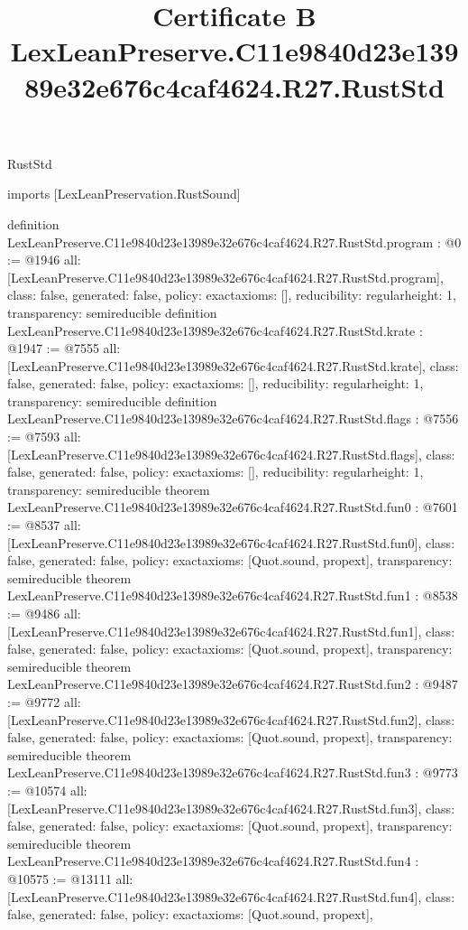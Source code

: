 \begin{lexlean}{RustStd}
\title{Certificate B LexLeanPreserve.C11e9840d23e13989e32e676c4caf4624.R27.RustStd}
\begin{coremodule}
imports [LexLeanPreservation.RustSound]

definition LexLeanPreserve.C11e9840d23e13989e32e676c4caf4624.R27.RustStd.program : @0 := @1946 {
  all: [LexLeanPreserve.C11e9840d23e13989e32e676c4caf4624.R27.RustStd.program],
  class: false,
  generated: false,
  policy: exact{axioms: []},
  reducibility: regular{height: 1},
  transparency: semireducible
}
definition LexLeanPreserve.C11e9840d23e13989e32e676c4caf4624.R27.RustStd.krate : @1947 := @7555 {
  all: [LexLeanPreserve.C11e9840d23e13989e32e676c4caf4624.R27.RustStd.krate],
  class: false,
  generated: false,
  policy: exact{axioms: []},
  reducibility: regular{height: 1},
  transparency: semireducible
}
definition LexLeanPreserve.C11e9840d23e13989e32e676c4caf4624.R27.RustStd.flags : @7556 := @7593 {
  all: [LexLeanPreserve.C11e9840d23e13989e32e676c4caf4624.R27.RustStd.flags],
  class: false,
  generated: false,
  policy: exact{axioms: []},
  reducibility: regular{height: 1},
  transparency: semireducible
}
theorem LexLeanPreserve.C11e9840d23e13989e32e676c4caf4624.R27.RustStd.fun0 : @7601 := @8537 {
  all: [LexLeanPreserve.C11e9840d23e13989e32e676c4caf4624.R27.RustStd.fun0],
  class: false,
  generated: false,
  policy: exact{axioms: [Quot.sound, propext]},
  transparency: semireducible
}
theorem LexLeanPreserve.C11e9840d23e13989e32e676c4caf4624.R27.RustStd.fun1 : @8538 := @9486 {
  all: [LexLeanPreserve.C11e9840d23e13989e32e676c4caf4624.R27.RustStd.fun1],
  class: false,
  generated: false,
  policy: exact{axioms: [Quot.sound, propext]},
  transparency: semireducible
}
theorem LexLeanPreserve.C11e9840d23e13989e32e676c4caf4624.R27.RustStd.fun2 : @9487 := @9772 {
  all: [LexLeanPreserve.C11e9840d23e13989e32e676c4caf4624.R27.RustStd.fun2],
  class: false,
  generated: false,
  policy: exact{axioms: [Quot.sound, propext]},
  transparency: semireducible
}
theorem LexLeanPreserve.C11e9840d23e13989e32e676c4caf4624.R27.RustStd.fun3 : @9773 := @10574 {
  all: [LexLeanPreserve.C11e9840d23e13989e32e676c4caf4624.R27.RustStd.fun3],
  class: false,
  generated: false,
  policy: exact{axioms: [Quot.sound, propext]},
  transparency: semireducible
}
theorem LexLeanPreserve.C11e9840d23e13989e32e676c4caf4624.R27.RustStd.fun4 : @10575 := @13111 {
  all: [LexLeanPreserve.C11e9840d23e13989e32e676c4caf4624.R27.RustStd.fun4],
  class: false,
  generated: false,
  policy: exact{axioms: [Quot.sound, propext]},
}
\end{coremodule}
\end{lexlean}
